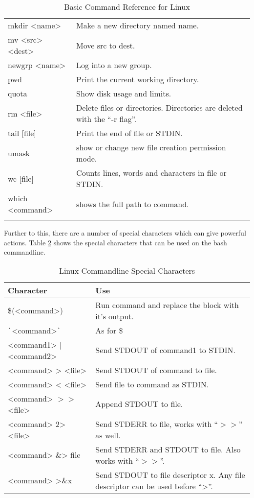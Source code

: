 \begin{center}
\begin{longtable}{lp{6cm}}
					mkdir <name> & Make a new directory named name. \\
					mv <src> <dest> & Move src to dest. \\
					newgrp <name> & Log into a new group. \\
					pwd & Print the current working directory. \\
					quota & Show disk usage and limits. \\
					rm <file> & Delete files or directories.
								Directories are deleted with the ``-r flag''. \\
					tail [file] & Print the end of file or STDIN. \\
					umask & show or change new file creation permission mode. \\
					wc [file] & Counts lines, words and characters in file or STDIN. \\
					which <command> & shows the full path to command. \\
					\noalign{\vskip 0.5cm}
					\caption{\label{tab:LinuxCommandsSummary}Basic Command Reference for Linux}
					\vspace{-1.3cm}
				\end{longtable}
			\end{center}

			Further to this, there are a number of special characters which can give powerful actions.
			Table \ref{tab:SpecialCommands} shows the special characters that can be used on the bash commandline.
			\begin{table}[H]
				\centering
				\begin{adjustbox}{max width=1\textwidth}
				\begin{tabular}{lp{7cm}}
					\toprule
					\textbf{Character} & \textbf{Use} \\
					\bottomrule
					\$(<command>) & Run command and replace the block with it's output. \\
					\verb+`+<command>\verb+`+  & As for \$ \\
					<command1> | <command2> & Send STDOUT of command1 to STDIN. \\
					<command> > <file> & Send STDOUT of command to file. \\
					<command> < <file> & Send file to command as STDIN. \\
					<command> \(>>\) <file> & Append STDOUT to file. \\
					<command> 2> <file> & Send STDERR to file, works with ``\(>>\)'' as well. \\
					<command> \&> file & Send STDERR and STDOUT to file. Also works with ``\(>>\)''. \\
					<command> >\&x & Send STDOUT to file descriptor x. Any file descriptor can be used before ``>''. \\
					\bottomrule
				\end{tabular}
			\end{adjustbox}
				\label{tab:SpecialCommands}
				\caption{Linux Commandline Special Characters}
			\end{table}

